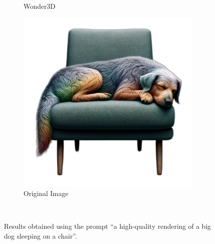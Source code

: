 \begin{figure}[ht]
\begin{subfigure}[b]{0.27\textwidth}
        \caption{Wonder3D}
        \vspace{0.1cm}
    \end{subfigure}
    \begin{subfigure}[b]{0.28\textwidth}
        \centering
        \includegraphics[width=\textwidth]{etc/Images/dog.png}
        \caption{Original Image}
        \vspace{0.1cm}
    \end{subfigure}
    \caption{Results obtained using the prompt ``a high-quality rendering of a big dog sleeping on a chair''.}~\label{fig:resultDogFront}
\end{figure}


